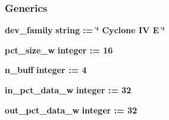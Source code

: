 \subsubsection*{Generics}
 \begin{DoxyCompactItemize}
\item 
{\bf dev\+\_\+family} {\bfseries {\bfseries \textcolor{comment}{string}\textcolor{vhdlchar}{ }\textcolor{vhdlchar}{ }\textcolor{vhdlchar}{\+:}\textcolor{vhdlchar}{=}\textcolor{vhdlchar}{ }\textcolor{vhdlchar}{ }\textcolor{vhdlchar}{ }\textcolor{vhdlchar}{ }\textcolor{keyword}{\char`\"{} Cyclone I\+V E \char`\"{}}\textcolor{vhdlchar}{ }}}
\item 
{\bf pct\+\_\+size\+\_\+w} {\bfseries {\bfseries \textcolor{comment}{integer}\textcolor{vhdlchar}{ }\textcolor{vhdlchar}{ }\textcolor{vhdlchar}{\+:}\textcolor{vhdlchar}{=}\textcolor{vhdlchar}{ }\textcolor{vhdlchar}{ } \textcolor{vhdldigit}{16} \textcolor{vhdlchar}{ }}}
\item 
{\bf n\+\_\+buff} {\bfseries {\bfseries \textcolor{comment}{integer}\textcolor{vhdlchar}{ }\textcolor{vhdlchar}{ }\textcolor{vhdlchar}{\+:}\textcolor{vhdlchar}{=}\textcolor{vhdlchar}{ }\textcolor{vhdlchar}{ } \textcolor{vhdldigit}{4} \textcolor{vhdlchar}{ }}}
\item 
{\bf in\+\_\+pct\+\_\+data\+\_\+w} {\bfseries {\bfseries \textcolor{comment}{integer}\textcolor{vhdlchar}{ }\textcolor{vhdlchar}{ }\textcolor{vhdlchar}{\+:}\textcolor{vhdlchar}{=}\textcolor{vhdlchar}{ }\textcolor{vhdlchar}{ } \textcolor{vhdldigit}{32} \textcolor{vhdlchar}{ }}}
\item 
{\bf out\+\_\+pct\+\_\+data\+\_\+w} {\bfseries {\bfseries \textcolor{comment}{integer}\textcolor{vhdlchar}{ }\textcolor{vhdlchar}{ }\textcolor{vhdlchar}{\+:}\textcolor{vhdlchar}{=}\textcolor{vhdlchar}{ }\textcolor{vhdlchar}{ } \textcolor{vhdldigit}{32} \textcolor{vhdlchar}{ }}}
\end{DoxyCompactItemize}
